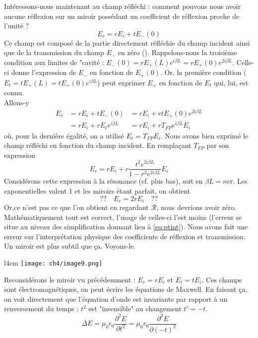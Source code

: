 Intéressons-nous maintenant au champ réfléchi : comment pouvons nous avoir aucune réflexion 
sur un miroir possédant un coefficient de réflexion proche de l'unité ?
\begin{equation}
E_r = rE_i+tE_-(0)
\end{equation}
Ce champ est composé de la partie directement réfléchie du champ incident ainsi que de la 
transmission du champ $E_-$ en zéro (\danger). Rappelons-nous la troisième condition aux 
limites de "cavité : $E_-(0) = rE_+(L)e^{i\beta L} = rE_+(0)e^{2i\beta L}$. Celle-ci donne 
l'expression de $E_-$ en fonction de $E_+(0)$. Or, la première condition ($E_t = tE_+(L) = 
tE_+(0)e^{i\beta L}$) peut exprimer $E_+$ en fonction de $E_t$ qui, lui, est connu.\\

Allons-y
\begin{equation}
\begin{array}{lll}
E_r &= rE_i+tE_-(0) &= rE_i +rtE_+(0)e^{2i\beta L}\\
&= rE_i + rE_te^{i\beta L} &= rE_i+rT_{FP}e^{i\beta L}E_i
\end{array}
\end{equation}
où, pour la dernière égalité, on a utilisé $E_t = T_{FP}E_i$. Nous avons bien exprimé le 
champ réfléchi en fonction du champ incident. En remplaçant $T_{FP}$ par son expression
\begin{equation}
E_r = rE_i + r\frac{t^2e^{2i\beta L}}{1-r^2e^{2i\beta L}}E_i
\end{equation}
Considérons cette expression à la résonance (cf. plus bas), soit en $\beta L = m\pi$. 
Les exponentielles valent 1 et les miroirs étant parfait, on obtient
\begin{equation}
??\quad E_r = 2rE_i\quad ??
\label{eq:ptint}
\end{equation}
Or,ce n'est pas ce que l'on obtient en regardant $\mathcal{R}$, nous devrions avoir zéro. 
Mathématiquement tout est correct, l'usage de celles-ci l'est moins (l'erreur se situe au 
niveau des simplification donnant lieu à \eqref{eq:ptint}). Nous avons fait une 
erreur sur l'interprétation physique des coefficients de réflexion et transmission. Un 
miroir est plus subtil que ça. Voyons-le.

\newpage
	\begin{wrapfigure}[6]{l}{4cm}
	\texttt{[image: ch4/image9.png]}
	\end{wrapfigure}
Reconsidérons le miroir vu précédemment : $E_r = rE_i$ et $E_t=tE_i$. Ces champs sont 
électromagnétiques, on peut écrire les équations de Maxwell. En faisant ça, on voit directement 
que l'équation d'onde est invariante par rapport à un renversement du temps : $t^2$ est 
"insensible" au changement $t'=-t$.
\begin{equation}
\Delta E = \mu_0\epsilon_0\dfrac{\partial^2E}{\partial t^2} = \mu_0\epsilon_0\dfrac{\partial^2 E}{
\partial (-t)^2}
\end{equation}

